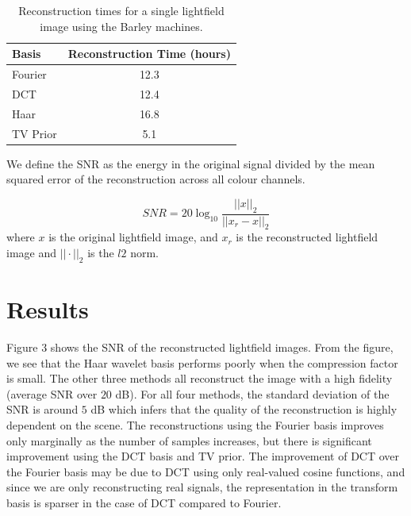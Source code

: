 \documentclass[10pt,twocolumn,letterpaper]{article}
\begin{document}
\begin{table}
  \begin{center}
  \begin{tabular}{|l|c|}
  \hline
  Basis & Reconstruction Time (hours)\\
  \hline\hline
  Fourier & 12.3 \\
  DCT & 12.4 \\
  Haar & 16.8\\
  TV Prior & 5.1\\ 
  \hline
  \end{tabular}
  \end{center}
  \caption{Reconstruction times for a single lightfield image using the Barley machines.}
\end{table}


We define the SNR as the energy in the original signal divided by the mean squared error of the reconstruction across all colour channels. 

\[SNR = 20 \log_{10}{\frac{||x||_2}{||x_r - x||_2}}\] where $x$ is the original lightfield image, and $x_r$ is the reconstructed lightfield image and $|| \cdot ||_2$ is the $l2$ norm.

\section{Results}

Figure 3 shows the SNR of the reconstructed lightfield images.  From the figure, we see that the Haar wavelet basis performs poorly when the compression factor is small. The other three methods all reconstruct the image with a high fidelity (average SNR over $20$ dB). For all four methods, the standard deviation of the SNR is around $5$ dB which infers that the quality of the reconstruction is highly dependent on the scene. The reconstructions using the Fourier basis improves only marginally as the number of samples increases, but there is significant improvement using the DCT basis and TV prior. The improvement of DCT over the Fourier basis may be due to DCT using only real-valued cosine functions, and since we are only reconstructing real signals, the representation in the transform basis is sparser in the case of DCT compared to Fourier.
\end{document}
